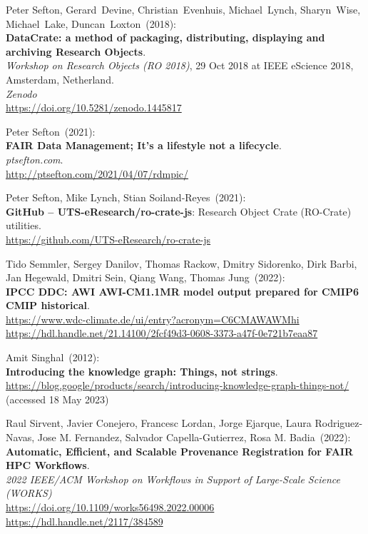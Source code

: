 \begin{thebibliography}{9}
Peter Sefton, Gerard~Devine, Christian~Evenhuis, Michael~Lynch, Sharyn~Wise, Michael~Lake, Duncan~Loxton~(2018): \\
\textbf{DataCrate: a method of packaging, distributing, displaying and archiving Research Objects}.\\
\emph{Workshop on Research Objects (RO 2018)}, 29 Oct 2018 at IEEE eScience 2018, Amsterdam, Netherland. \\
\emph{Zenodo}\\
\url{https://doi.org/10.5281/zenodo.1445817}

Peter Sefton~(2021): \\
\textbf{FAIR Data Management; It's a lifestyle not a lifecycle}.\\
\emph{ptsefton.com}. \\
\url{http://ptsefton.com/2021/04/07/rdmpic/}

Peter Sefton, Mike Lynch, Stian Soiland-Reyes~(2021): \\
\textbf{GitHub -- UTS-eResearch/ro-crate-js}: Research Object Crate (RO-Crate) utilities.\\
\url{https://github.com/UTS-eResearch/ro-crate-js}

Tido Semmler, Sergey Danilov, Thomas Rackow, Dmitry Sidorenko, Dirk Barbi, Jan Hegewald, Dmitri Sein, Qiang Wang, Thomas Jung~(2022): \\
\textbf{IPCC DDC: AWI AWI-CM1.1MR model output prepared for CMIP6 CMIP historical}. \\
\url{https://www.wdc-climate.de/ui/entry?acronym=C6CMAWAWMhi}\\
\url{https://hdl.handle.net/21.14100/2fcf49d3-0608-3373-a47f-0e721b7eaa87}

Amit Singhal~(2012): \\
\textbf{Introducing the knowledge graph: Things, not strings}.\\
\url{https://blog.google/products/search/introducing-knowledge-graph-things-not/}
(accessed 18 May 2023)

Raul Sirvent, Javier Conejero, Francesc Lordan, Jorge Ejarque, Laura Rodriguez-Navas, Jose M. Fernandez, Salvador Capella-Gutierrez, Rosa M. Badia~(2022): \\
\textbf{Automatic, Efficient, and Scalable Provenance Registration for FAIR HPC Workflows}.\\
\emph{2022 IEEE/ACM Workshop on Workflows in Support of Large-Scale Science (WORKS)}\\
\url{https://doi.org/10.1109/works56498.2022.00006}\\
\url{https://hdl.handle.net/2117/384589}


\end{thebibliography}
